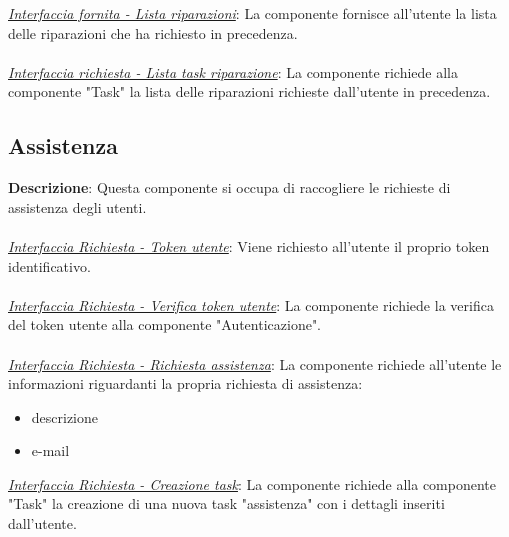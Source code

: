 \documentclass{report}
\begin{document}
\uline{\textit{Interfaccia fornita - Lista riparazioni}}: %
La componente fornisce all'utente la lista delle riparazioni che ha richiesto in precedenza.\\\\
\uline{\textit{Interfaccia richiesta - Lista task riparazione}}: 
La componente richiede alla componente "Task" la lista delle riparazioni richieste dall'utente in precedenza.

\subsection*{Assistenza}
\textbf{Descrizione}: Questa componente si occupa di raccogliere le richieste di assistenza degli utenti.\\\\
\uline{\textit{Interfaccia Richiesta - Token utente}}: 
Viene richiesto all'utente il proprio token identificativo.\\\\
\uline{\textit{Interfaccia Richiesta - Verifica token utente}}:
La componente richiede la verifica del token utente alla componente "Autenticazione".\\\\
\uline{\textit{Interfaccia Richiesta - Richiesta assistenza}}:
La componente richiede all'utente le informazioni riguardanti la propria richiesta di assistenza:
\begin{itemize}
	\item descrizione
	\item e-mail
\end{itemize}
\uline{\textit{Interfaccia Richiesta - Creazione task}}:
La componente richiede alla componente "Task" la creazione di una nuova task "assistenza" con i dettagli inseriti dall'utente.
\end{document}
